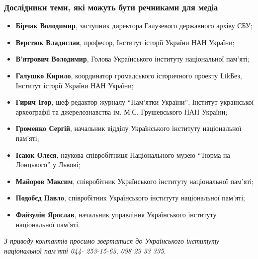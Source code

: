  
 
 
 
 

\subsubsection{Дослідники теми, які можуть бути речниками для медіа}

\begin{itemize} %
\item \textbf{Бірчак Володимир}, заступник директора Галузевого державного архіву СБУ;
\item \textbf{Верстюк Владислав}, професор, Інститут історії України НАН України;
\item \textbf{В'ятрович Володимир}, Голова Українського інституту національної пам'яті;
\item \textbf{Галушко Кирило}, координатор громадського історичного проекту LikБез, Інститут історії України НАН України;
\item \textbf{Гирич Ігор}, шеф-редактор журналу \enquote{Пам'ятки України}, Інститут української археографії та джерелознавства ім. М.С. Грушевського НАН України;
\item \textbf{Громенко Сергій}, начальник відділу Українського інституту національної пам'яті;
\item \textbf{Ісаюк Олеся}, наукова співробітниця Національного музею \enquote{Тюрма на Лонцького} у Львові;
\item \textbf{Майоров Максим}, співробітник Українського інституту національної пам'яті;
\item \textbf{Подобєд Павло}, співробітник Українського інституту національної пам'яті;
\item \textbf{Файзулін Ярослав}, начальник управління Українського інституту національної пам'яті.
\end{itemize} %

\begingroup
\em З приводу контактів просимо звертатися до Українського інституту національної пам'яті 044- 253-15-63, 098 29 33 335.
\endgroup
